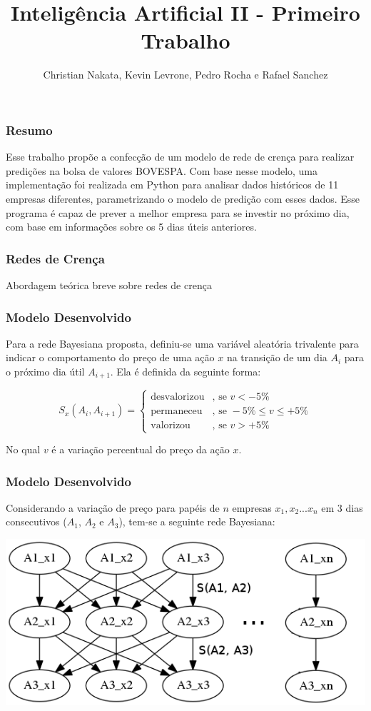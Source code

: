 \documentclass[Madrid]{beamer}
\begin{document}
\author{Christian Nakata, Kevin Levrone, Pedro Rocha e Rafael Sanchez}
\title{Inteligência Artificial II - Primeiro Trabalho}
\maketitle

\begin{frame}
	\frametitle{Resumo}
	Esse trabalho propõe a confecção de um modelo de rede de crença para realizar predições na bolsa de valores BOVESPA. Com base nesse modelo, uma implementação foi realizada em Python para analisar dados históricos de 11 empresas diferentes, parametrizando o modelo de predição com esses dados. Esse programa é capaz de prever a melhor empresa para se investir no próximo dia, com base em informações sobre os 5 dias úteis anteriores.  
\end{frame}

\begin{frame}
	\frametitle{Redes de Crença}
	Abordagem teórica breve sobre redes de crença
\end{frame}

\begin{frame}
	\frametitle{Modelo Desenvolvido}
	
	Para a rede Bayesiana proposta, definiu-se uma variável aleatória trivalente para indicar o comportamento do preço de uma ação $x$ na transição de um dia \textbf{$A_i$} para o próximo dia útil \textbf{$A_{i+1}$}. Ela é definida da seguinte forma:
	
\begin{equation}
	S_x(A_i, A_{i+1}) = \begin{cases}	\text{desvalorizou} & \text{, se } v < -5\%\\
								\text{permaneceu} & \text{, se } -5\% \leq v \leq +5\%\\
								\text{valorizou} & \text{, se } v > +5\%\end{cases}
\end{equation}

	No qual $v$ é a variação percentual do preço da ação $x$.
\end{frame}

\begin{frame}
	\frametitle{Modelo Desenvolvido}
	
	Considerando a variação de preço para papéis de $n$ empresas $x_1, x_2 ... x_n$ em 3 dias consecutivos ($A_1$, $A_2$ e $A_3$), tem-se a seguinte rede Bayesiana:
	
	\includegraphics[scale=0.5]{bayes.png}
\end{frame}
\end{document}
